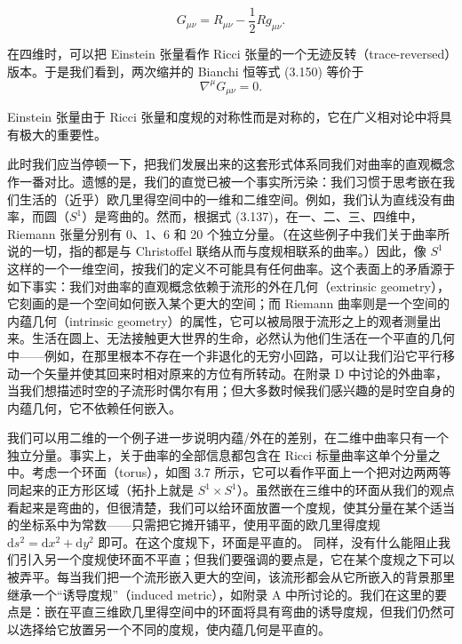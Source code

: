 \begin{equation*}
G_{\mu\nu} = R_{\mu\nu} - \frac{1}{2} R g_{\mu\nu}.
\tag{3.151}
\end{equation*}

在四维时，可以把 Einstein 张量看作 Ricci 张量的一个无迹反转（trace-reversed）版本。于是我们看到，两次缩并的 Bianchi 恒等式 (3.150) 等价于
\begin{equation*}
\nabla^\mu G_{\mu\nu} = 0.
\tag{3.152}
\end{equation*}

Einstein 张量由于 Ricci 张量和度规的对称性而是对称的，它在广义相对论中将具有极大的重要性。

此时我们应当停顿一下，把我们发展出来的这套形式体系同我们对曲率的直观概念作一番对比。遗憾的是，我们的直觉已被一个事实所污染：我们习惯于思考嵌在我们生活的（近乎）欧几里得空间中的一维和二维空间。例如，我们认为直线没有曲率，而圆（$S^1$）是弯曲的。然而，根据式 (3.137)，在一、二、三、四维中，Riemann 张量分别有 0、1、6 和 20 个独立分量。（在这些例子中我们关于曲率所说的一切，指的都是与 Christoffel 联络从而与度规相联系的曲率。）因此，像 $S^1$ 这样的一个一维空间，按我们的定义不可能具有任何曲率。这个表面上的矛盾源于如下事实：我们对曲率的直观概念依赖于流形的外在几何（extrinsic geometry），它刻画的是一个空间如何嵌入某个更大的空间；而 Riemann 曲率则是一个空间的内蕴几何（intrinsic geometry）的属性，它可以被局限于流形之上的观者测量出来。生活在圆上、无法接触更大世界的生命，必然认为他们生活在一个平直的几何中——例如，在那里根本不存在一个非退化的无穷小回路，可以让我们沿它平行移动一个矢量并使其回来时相对原来的方位有所转动。在附录 D 中讨论的外曲率，当我们想描述时空的子流形时偶尔有用；但大多数时候我们感兴趣的是时空自身的内蕴几何，它不依赖任何嵌入。

我们可以用二维的一个例子进一步说明内蕴/外在的差别，在二维中曲率只有一个独立分量。事实上，关于曲率的全部信息都包含在 Ricci 标量曲率这单个分量之中。考虑一个环面（torus），如图 3.7 所示，它可以看作平面上一个把对边两两等同起来的正方形区域（拓扑上就是 $S^1\times S^1$）。虽然嵌在三维中的环面从我们的观点看起来是弯曲的，但很清楚，我们可以给环面放置一个度规，使其分量在某个适当的坐标系中为常数——只需把它摊开铺平，使用平面的欧几里得度规 $\mathrm{d}s^2 = \mathrm{d}x^2 + \mathrm{d}y^2$ 即可。在这个度规下，环面是平直的。
同样，没有什么能阻止我们引入另一个度规使环面不平直；但我们要强调的要点是，它在某个度规之下可以被弄平。每当我们把一个流形嵌入更大的空间，该流形都会从它所嵌入的背景那里继承一个“诱导度规”（induced metric），如附录 A 中所讨论的。我们在这里的要点是：嵌在平直三维欧几里得空间中的环面将具有弯曲的诱导度规，但我们仍然可以选择给它放置另一个不同的度规，使内蕴几何是平直的。

